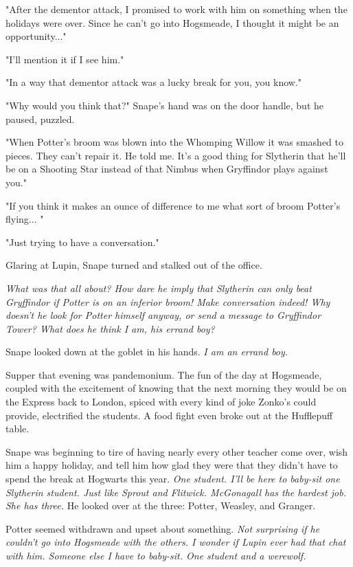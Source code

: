 "After the dementor attack, I promised to work with him on something when the holidays were over. Since he can't go into Hogsmeade, I thought it might be an opportunity..."

"I'll mention it if I see him."

"In a way that dementor attack was a lucky break for you, you know."

"Why would you think that?" Snape's hand was on the door handle, but he paused, puzzled.

"When Potter's broom was blown into the Whomping Willow it was smashed to pieces. They can't repair it. He told me. It's a good thing for Slytherin that he'll be on a Shooting Star instead of that Nimbus when Gryffindor plays against you."

"If you think it makes an ounce of difference to me what sort of broom Potter's flying... "

"Just trying to have a conversation."

Glaring at Lupin, Snape turned and stalked out of the office.

\emph{What was that all about? How dare he imply that Slytherin can only beat Gryffindor if Potter is on an inferior broom! Make conversation indeed! Why doesn't he look for Potter himself anyway, or send a message to Gryffindor Tower? What does he think I am, his errand boy?}

Snape looked down at the goblet in his hands. \emph{I am an errand boy.}

Supper that evening was pandemonium. The fun of the day at Hogsmeade, coupled with the excitement of knowing that the next morning they would be on the Express back to London, spiced with every kind of joke Zonko's could provide, electrified the students. A food fight even broke out at the Hufflepuff table.

Snape was beginning to tire of having nearly every other teacher come over, wish him a happy holiday, and tell him how glad they were that they didn't have to spend the break at Hogwarts this year. \emph{One student. I'll be here to baby-sit one Slytherin student. Just like Sprout and Flitwick. McGonagall has the hardest job. She has three.} He looked over at the three: Potter, Weasley, and Granger.

Potter seemed withdrawn and upset about something. \emph{Not surprising if he couldn't go into Hogsmeade with the others. I wonder if Lupin ever had that chat with him. Someone else I have to baby-sit. One student and a werewolf.}

